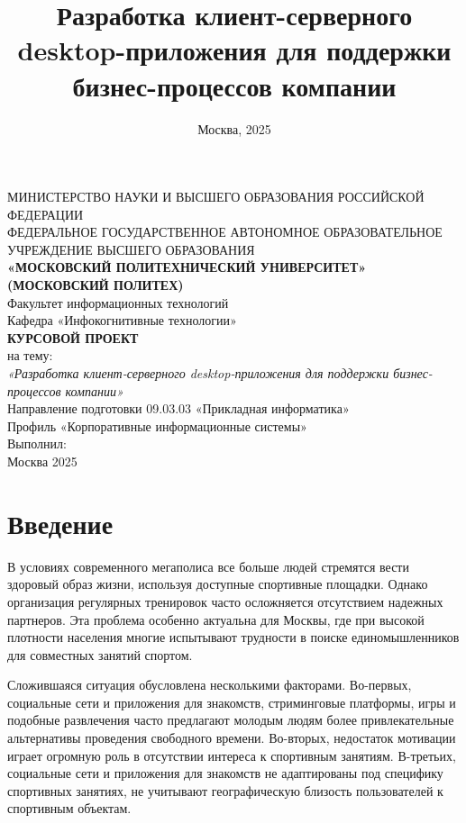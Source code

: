 \documentclass[14pt]{article}
\title{Разработка клиент-серверного desktop-приложения для поддержки бизнес-процессов компании}
\author{}
\date{Москва, 2025}
\begin{document}
\onehalfspacing

\begin{center}
	МИНИСТЕРСТВО НАУКИ И ВЫСШЕГО ОБРАЗОВАНИЯ РОССИЙСКОЙ ФЕДЕРАЦИИ \\[0.2cm]
	ФЕДЕРАЛЬНОЕ ГОСУДАРСТВЕННОЕ АВТОНОМНОЕ ОБРАЗОВАТЕЛЬНОЕ УЧРЕЖДЕНИЕ ВЫСШЕГО ОБРАЗОВАНИЯ \\[0.2cm]
	\textbf{«МОСКОВСКИЙ ПОЛИТЕХНИЧЕСКИЙ УНИВЕРСИТЕТ» (МОСКОВСКИЙ ПОЛИТЕХ)} \\[1cm]
	Факультет информационных технологий \\[0.2cm]
	Кафедра «Инфокогнитивные технологии» \\[4 cm]

	\textbf{КУРСОВОЙ ПРОЕКТ} \\[0.2cm]
	на тему: \\
	\textit{«Разработка клиент-серверного desktop-приложения для поддержки бизнес-процессов компании»} \\[0.5cm]

	Направление подготовки 09.03.03 «Прикладная информатика» \\
	Профиль «Корпоративные информационные системы» \\
	\vfill
	\hfill Выполнил: \\
	\vfill
	Москва 2025
\end{center}

\newpage

\fontsize{14pt}{18pt}\selectfont

\section*{ Введение}
В условиях современного мегаполиса все больше людей стремятся вести здоровый образ жизни, используя доступные спортивные площадки.
Однако организация регулярных тренировок часто осложняется отсутствием надежных партнеров. Эта проблема особенно актуальна для Москвы,
где при высокой плотности населения многие испытывают трудности в поиске единомышленников для совместных занятий спортом.

Сложившаяся ситуация обусловлена несколькими факторами. Во-первых, социальные сети и приложения для знакомств, стриминговые платформы,
игры и подобные развлечения часто предлагают молодым людям более привлекательные альтернативы проведения свободного времени. Во-вторых,
недостаток мотивации играет огромную роль в отсутствии интереса к спортивным занятиям. В-третьих, социальные сети и приложения для знакомств не
адаптированы под специфику спортивных занятиях, не учитывают географическую близость пользователей к спортивным объектам.
\end{document}

